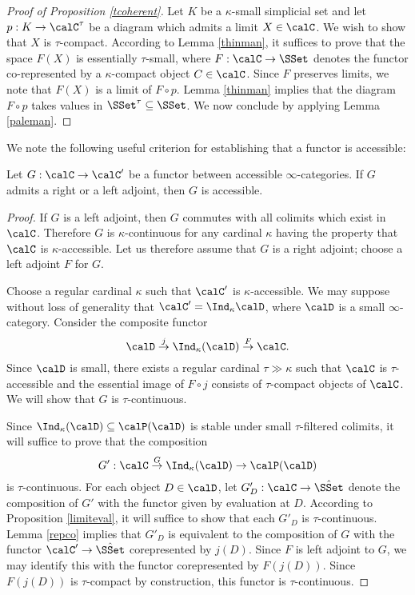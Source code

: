 \begin{proof}[Proof of Proposition \ref{tcoherent}]
Let $K$ be a $\kappa$-small simplicial set and let $p: K \rightarrow \calC^{\tau}$ be a diagram
which admits a limit $X \in \calC$. We wish to show that $X$ is $\tau$-compact. According to
Lemma \ref{thinman}, it suffices to prove that the space $F(X)$ is essentially $\tau$-small, where
$F: \calC \rightarrow \SSet$ denotes the functor co-represented by a $\kappa$-compact object $C \in \calC$. Since $F$ preserves limits, we note that $F(X)$ is a limit of $F \circ p$. Lemma \ref{thinman} implies that the diagram $F \circ p$ takes values in $\SSet^{\tau} \subseteq \SSet$.
We now conclude by applying Lemma \ref{paleman}.
\end{proof}

We note the following useful criterion for establishing that a functor is accessible:

\begin{proposition}\label{adjoints}
Let $G: \calC \rightarrow \calC'$ be a functor between accessible
$\infty$-categories. If $G$ admits a right or a left adjoint, then $G$ is
accessible.
\end{proposition}

\begin{proof}
If $G$ is a left adjoint, then $G$ commutes with all colimits which exist in $\calC$.
Therefore $G$ is $\kappa$-continuous for any cardinal $\kappa$ having the property that
$\calC$ is $\kappa$-accessible. Let us therefore assume that $G$ is a right
adjoint; choose a left adjoint $F$ for $G$.

Choose a regular cardinal $\kappa$ such that $\calC'$ is $\kappa$-accessible. We may suppose without loss of generality that $\calC' = \Ind_{\kappa} \calD$, where $\calD$ is a small $\infty$-category. Consider the composite functor
$$ \calD \stackrel{j}{\rightarrow} \Ind_{\kappa}(\calD) \stackrel{F}{\rightarrow} \calC.$$
Since $\calD$ is small, there exists a regular cardinal $\tau \gg \kappa$ such that
$\calC$ is $\tau$-accessible and the essential image of $F \circ j$ consists of $\tau$-compact
objects of $\calC$. We will show that $G$ is $\tau$-continuous.

Since $\Ind_{\kappa}(\calD) \subseteq \calP(\calD)$ is stable under small $\tau$-filtered colimits, it will suffice to prove that the composition
$$ G': \calC \stackrel{G}{\rightarrow} \Ind_{\kappa}(\calD) \rightarrow \calP(\calD)$$
is $\tau$-continuous. For each object $D \in \calD$, let $G'_{D}: \calC \rightarrow \hat{\SSet}$
denote the composition of $G'$ with the functor given by evaluation at $D$. According to Proposition \ref{limiteval}, it will suffice to show that each $G'_{D}$ is $\tau$-continuous.
Lemma \ref{repco} implies that $G'_{D}$ is equivalent to the composition of $G$ with
the functor $\calC' \rightarrow \hat{\SSet}$ corepresented by $j(D)$. Since $F$ is left adjoint to $G$, we may identify this with the functor corepresented by $F(j(D))$. Since $F(j(D))$ is $\tau$-compact by construction, this functor is $\tau$-continuous.
\end{proof}

